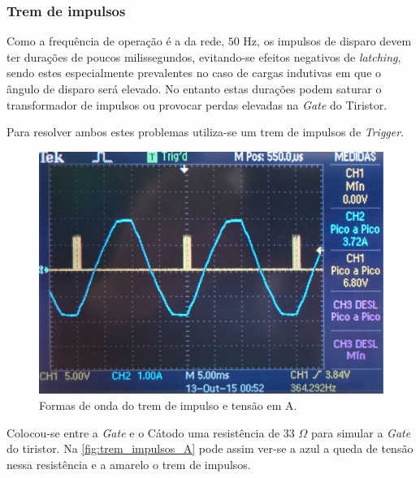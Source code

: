 \documentclass[a4paper,11pt]{article}
\numberwithin{equation}{section}
\begin{document}
\subsubsection{Trem de impulsos}

Como a frequência de operação é a da rede, $50$ Hz, os impulsos de disparo devem ter durações de poucos milissegundos, evitando-se efeitos negativos de \textit{latching}, sendo estes especialmente prevalentes no caso de cargas indutivas em que o ângulo de disparo será elevado. No entanto estas durações podem saturar o transformador de impulsos ou provocar perdas elevadas na \textit{Gate} do Tiristor.

Para resolver ambos estes problemas utiliza-se um trem de impulsos de \textit{Trigger}.

\begin{figure}[H]
	\centering
	\includegraphics[keepaspectratio=true, scale=0.115]{img/figs/trem_impulsos_A}
	\caption{Formas de onda do trem de impulso e tensão em A.}
	\label{fig:trem_impulsos_A}
	\vspace{-0.8em}
\end{figure}

Colocou-se entre a \textit{Gate} e o Cátodo uma resistência de $33$ $\Omega$ para simular a \textit{Gate} do tiristor. Na \autoref{fig:trem_impulsos_A} pode assim ver-se a azul a queda de tensão nessa resistência e a amarelo o trem de impulsos.
\end{document}
